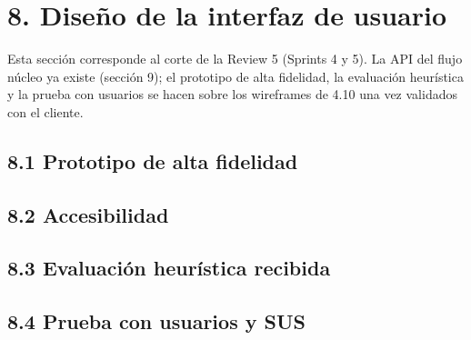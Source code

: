 \section{8. Diseño de la interfaz de
usuario}\label{diseuxf1o-de-la-interfaz-de-usuario}

Esta sección corresponde al corte de la Review 5 (Sprints 4 y 5). La API
del flujo núcleo ya existe (sección 9); el prototipo de alta fidelidad,
la evaluación heurística y la prueba con usuarios se hacen sobre los
wireframes de 4.10 una vez validados con el cliente.

\subsection{8.1 Prototipo de alta
fidelidad}\label{prototipo-de-alta-fidelidad}

\pendiente{}

\subsection{8.2 Accesibilidad}\label{accesibilidad}

\pendiente{}

\subsection{8.3 Evaluación heurística
recibida}\label{evaluaciuxf3n-heuruxedstica-recibida}

\pendiente{}

\subsection{8.4 Prueba con usuarios y
SUS}\label{prueba-con-usuarios-y-sus}

\pendiente{}
